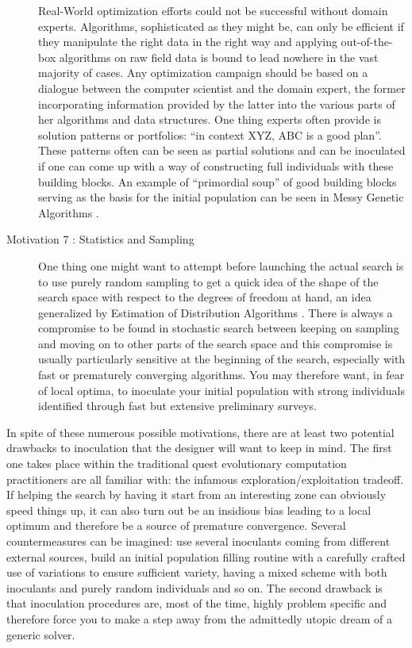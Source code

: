 \documentclass[english]{DESCARWINreport}
\begin{document}
\begin{description}
Real-World optimization efforts could not be successful without domain experts. Algorithms, sophisticated as they might be, can only be efficient if they manipulate the right data in the right way and applying out-of-the-box algorithms on raw field data is bound to lead nowhere in the vast majority of cases. Any optimization campaign should be based on a dialogue between the computer scientist and the domain expert, the former incorporating information provided by the latter into the various parts of her algorithms and data structures. One thing experts often provide is solution patterns or portfolios: ``in context XYZ, ABC is a good plan''. These patterns often can be seen as partial solutions and can be inoculated if one can come up with a way of constructing full individuals with these building blocks. An example of ``primordial soup'' of good building blocks serving as the basis for the initial population can be seen in Messy Genetic Algorithms \cite{Kargupta95search}.

\item[Motivation 7 : Statistics and Sampling]

One thing one might want to attempt before launching the actual search is to use purely random sampling to get a quick idea of the shape of the search space with respect to the degrees of freedom at hand, an idea generalized by Estimation of Distribution Algorithms \cite{Baluja95removingthe, Larranaga:2002b}
. There is always a compromise to be found in stochastic search between keeping on sampling and moving on to other parts of the search space and this compromise is usually particularly sensitive at the beginning of the search, especially with fast or prematurely converging algorithms. You may therefore want, in fear of local optima, to inoculate your initial population with strong individuals identified through fast but extensive preliminary surveys.


\end{description}


In spite of these numerous possible motivations, there are at least two potential drawbacks to inoculation that the designer will want to keep in mind. The first one takes place within the traditional quest evolutionary computation practitioners are all familiar with: the infamous exploration/exploitation tradeoff. If helping the search by having it start from an interesting zone can obviously speed things up, it can also turn out be an insidious bias leading to a local optimum and therefore be a source of premature convergence. Several countermeasures can be imagined: use several inoculants coming from different external sources, build an initial population filling routine with a carefully crafted use of variations to ensure sufficient variety, having a mixed scheme with both inoculants and purely random individuals and so on. The second drawback is that inoculation procedures are, most of the time, highly problem specific and therefore force you to make a step away from the admittedly utopic dream of a generic solver.
\end{document}
